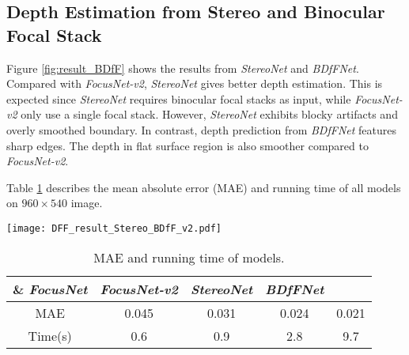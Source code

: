 \documentclass[10pt,twocolumn,letterpaper]{article}
\begin{document}
\subsection{Depth Estimation from Stereo and Binocular Focal Stack}
\label{section:stereoAndBDfF}

Figure \ref{fig:result_BDfF} shows the results from \emph{StereoNet} and \emph{BDfFNet}. Compared with \emph{FocusNet-v2}, \emph{StereoNet} gives better depth estimation. This is expected since \emph{StereoNet} requires binocular focal stacks as input, while \emph{FocusNet-v2} only use a single focal stack. However, \emph{StereoNet} exhibits blocky artifacts and overly smoothed boundary. In contrast, depth prediction from \emph{BDfFNet} features sharp edges. The depth in flat surface region is also smoother compared to \emph{FocusNet-v2}.

Table \ref{tab:result} describes the mean absolute error (MAE) and running time of all models on $960\times540$ image.

\begin{figure*}[t]
\begin{center}
   \texttt{[image: DFF\_result\_Stereo\_BDfF\_v2.pdf]}
\end{center}
\vspace{-8pt}
   \caption{Comparisons on results only using \emph{StereoNet} vs. the composed \emph{BDfFNet}. BDfFNet produces much sharper boundaries while reducing blocky artifacts.}
\label{fig:result_BDfF}
\end{figure*}

\begin{table}[b]
\begin{center}
 \begin{tabular}{|c|c |c |c |c|}

    \hline
    \& \emph{FocusNet}   & \emph{FocusNet-v2} & \emph{StereoNet} & \emph{BDfFNet} \\ [0.5ex]
    \hline
    MAE & 0.045  & 0.031 & 0.024 & 0.021 \\
    Time(s) & 0.6  & 0.9 & 2.8 & 9.7 \\

 \hline

\end{tabular}
\caption{MAE and running time of models.}
\label{tab:result}
\end{center}
\end{table}
\end{document}
